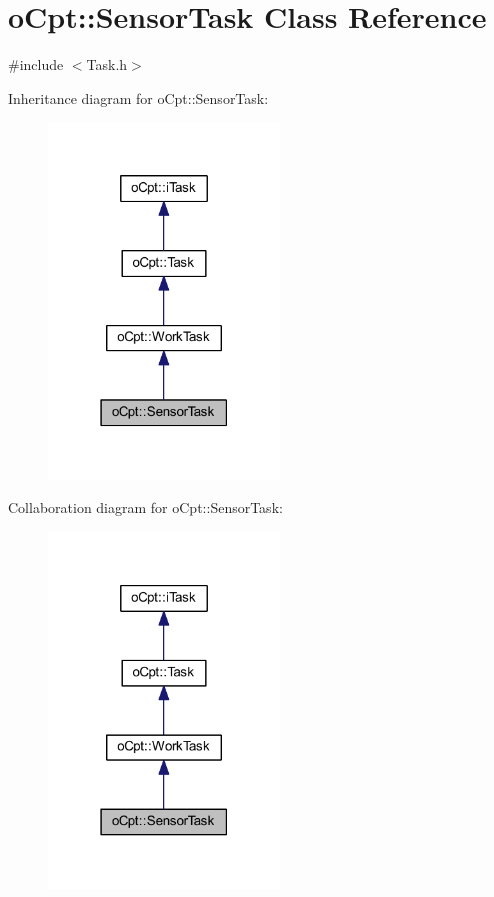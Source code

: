 \hypertarget{classo_cpt_1_1_sensor_task}{}\section{o\+Cpt\+:\+:Sensor\+Task Class Reference}
\label{classo_cpt_1_1_sensor_task}


{\ttfamily \#include $<$Task.\+h$>$}



Inheritance diagram for o\+Cpt\+:\+:Sensor\+Task\+:
\nopagebreak
\begin{figure}[H]
\begin{center}
\leavevmode
\includegraphics[width=174pt]{classo_cpt_1_1_sensor_task__inherit__graph}
\end{center}
\end{figure}


Collaboration diagram for o\+Cpt\+:\+:Sensor\+Task\+:
\nopagebreak
\begin{figure}[H]
\begin{center}
\leavevmode
\includegraphics[width=174pt]{classo_cpt_1_1_sensor_task__coll__graph}
\end{center}
\end{figure}
